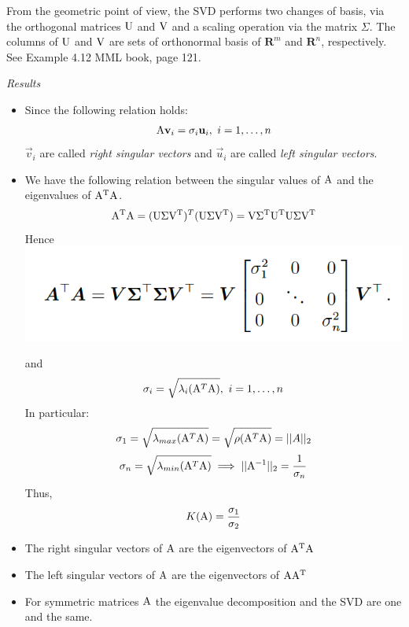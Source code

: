 From the geometric point of view, the SVD performs two changes of basis, via the orthogonal matrices $\mathrm{U}$ and $\mathrm{V}$ and a scaling operation via the matrix $\Sigma$. The columns of $\mathrm{U}$ and $\mathrm{V}$ are sets of orthonormal basis of $\mathbf{R}^m$ and  $\mathbf{R}^n$, respectively. See Example 4.12 MML book, page 121.

\textit{Results}
\begin{itemize}
\item Since the following relation holds:
$$\mathrm{A}\mathbf{v}_i=\sigma_i \mathbf{u}_i,\ i = 1, \ldots, n$$
$\vec{v}_i$ are called \textit{right singular vectors} and $\vec{u}_i$  are called \textit{left singular vectors}.
\item 
We have the following relation between the singular values of $\mathrm{A}$ and the eigenvalues of $\mathrm{A^T A}$.
$$\mathrm{A^T A}=(\mathrm{U \Sigma V^T})^T(\mathrm{U \Sigma V^T})=\mathrm{V \Sigma ^T U^T U \Sigma V^T}$$
Hence 
\includegraphics[width=0.7 \textwidth]{sections/images/svd2.png}

and
$$\sigma_i = \sqrt{\lambda_i(\mathrm{A}^T\mathrm{A})},\ i = 1, \hdots, n$$
In particular:
$$ \sigma_1 = \sqrt{\lambda_{max}(\mathrm{A}^T\mathrm{A})} = \sqrt{\rho(\mathrm{A}^T\mathrm{A})} = ||A||_2 $$
$$ \sigma_n = \sqrt{\lambda_{min}(\mathrm{A}^T\mathrm{A})} \implies ||\mathrm{A}^{-1}||_2 = \frac{1}{\sigma_n} $$
Thus,
$$ K(\mathrm{A}) = \frac{\sigma_1}{\sigma_2} $$
\item The right singular vectors of $\mathrm{A}$ are the eigenvectors of $\mathrm{A^T A}$
\item The left singular vectors of $\mathrm{A}$ are the eigenvectors of $\mathrm{AA^T }$
\item For symmetric matrices $\mathrm{A}$ the eigenvalue decomposition and the SVD are one and the same.

\end{itemize}

